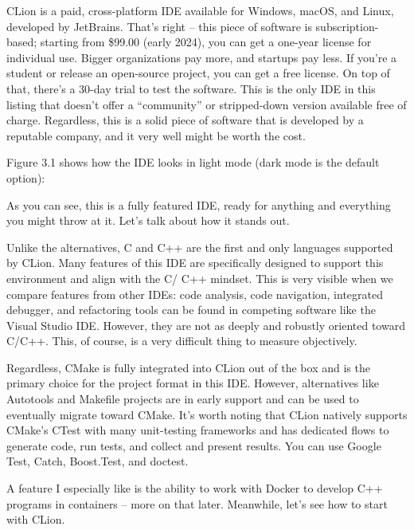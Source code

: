 CLion is a paid, cross-platform IDE available for Windows, macOS, and Linux, developed by JetBrains. That’s right – this piece of software is subscription-based; starting from \$99.00 (early 2024), you can get a one-year license for individual use. Bigger organizations pay more, and startups pay less. If you’re a student or release an open-source project, you can get a free license. On top of that, there’s a 30-day trial to test the software. This is the only IDE in this listing that doesn’t offer a “community” or stripped-down version available free of charge. Regardless, this is a solid piece of software that is developed by a reputable company, and it very well might be worth the cost.

Figure 3.1 shows how the IDE looks in light mode (dark mode is the default option):


As you can see, this is a fully featured IDE, ready for anything and everything you might throw at it. Let’s talk about how it stands out.


Unlike the alternatives, C and C++ are the first and only languages supported by CLion. Many features of this IDE are specifically designed to support this environment and align with the C/ C++ mindset. This is very visible when we compare features from other IDEs: code analysis, code navigation, integrated debugger, and refactoring tools can be found in competing software like the Visual Studio IDE. However, they are not as deeply and robustly oriented toward C/C++. This, of course, is a very difficult thing to measure objectively.

Regardless, CMake is fully integrated into CLion out of the box and is the primary choice for the project format in this IDE. However, alternatives like Autotools and Makefile projects are in early support and can be used to eventually migrate toward CMake. It’s worth noting that CLion natively supports CMake’s CTest with many unit-testing frameworks and has dedicated flows to generate code, run tests, and collect and present results. You can use Google Test, Catch, Boost.Test, and doctest.

A feature I especially like is the ability to work with Docker to develop C++ programs in containers – more on that later. Meanwhile, let’s see how to start with CLion.


